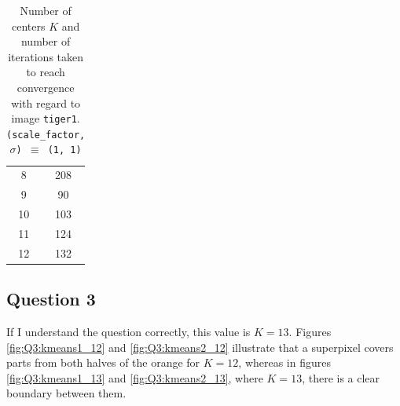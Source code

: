 \begin{table}[H]
{{\begin{minipage}[b]{0.45\hsize}
\begin{tabular}{c|c}
      8                 & 208                   \\
      9                 & 90                    \\
      10                & 103                   \\
      11                & 124                   \\
      12                & 132                   \\
    \end{tabular}
    \caption{Number of centers $K$ and number of iterations taken to reach
      convergence with regard to image \texttt{tiger1}.
      \texttt{(scale\_factor, $\sigma$) $\equiv$ (1, 1)}}
    \label{tab:convergence_tiger}
  \end{minipage}
}}
\end{table}


\subsection{Question 3}

If I understand the question correctly, this value is $K=13$.
Figures \ref{fig:Q3:kmeans1_12} and \ref{fig:Q3:kmeans2_12} illustrate that
a superpixel covers parts from both halves of the orange for $K=12$,
whereas in figures \ref{fig:Q3:kmeans1_13} and \ref{fig:Q3:kmeans2_13},
where $K=13$, there is a clear boundary between them.

